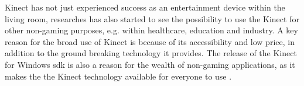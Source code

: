 Kinect has not just experienced success as an entertainment device within the living room, researches has also started to see the possibility to use the Kinect for other non-gaming purposes, e.g. within healthcare, education and industry. A key reason for the broad use of Kinect is because of its accessibility and low price, in addition to the ground breaking technology it provides. The release of the Kinect for Windows \ac{sdk} is also a reason for the wealth of non-gaming applications, as it makes the the Kinect technology available for everyone to use \cite{microsoftnews}. 

